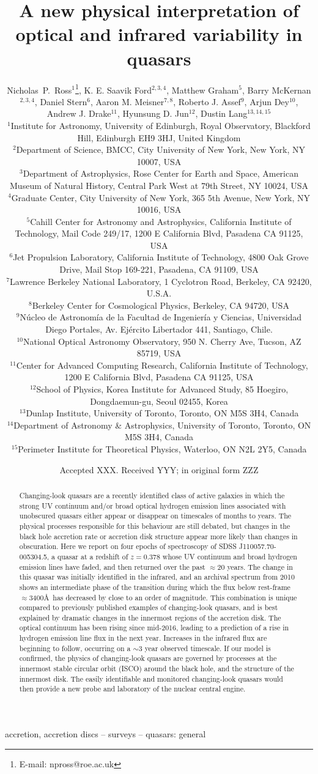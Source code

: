 \documentclass[a4paper,fleqn,usenatbib]{mnras}
\title[Variability in the quasar J1100-0053]{A new physical interpretation of optical and infrared variability in quasars}
\author[N.P. Ross et al.]
{Nicholas~P.~Ross$^{1}$\thanks{E-mail: npross@roe.ac.uk},    
K. E. Saavik Ford$^{2,3,4}$,  Matthew Graham$^{5}$,  Barry McKernan$^{2,3,4}$,  
\newauthor Daniel Stern$^{6}$, Aaron M. Meisner$^{7,8}$, Roberto J. Assef$^{9}$, 
Arjun Dey$^{10}$, Andrew J. Drake$^{11}$, 
\newauthor Hyunsung D. Jun$^{12}$, Dustin Lang$^{13,14,15}$
\\
$^{1}$Institute for Astronomy, University of Edinburgh, Royal Observatory, Blackford Hill, Edinburgh EH9 3HJ, United Kingdom \\
$^{2}$Department of Science, BMCC, City University of New York, New York, NY 10007, USA \\
$^{3}$Department of Astrophysics, Rose Center for Earth and Space, American Museum of Natural History, Central Park West at 79th Street, NY 10024, USA \\
$^{4}$Graduate Center, City University of New York, 365 5th Avenue, New York, NY 10016, USA\\
$^{5}$Cahill Center for Astronomy and Astrophysics, California Institute of Technology, Mail Code 249/17, 1200 E California Blvd, Pasadena CA 91125, USA\\
$^{6}$Jet Propulsion Laboratory, California Institute of Technology, 4800 Oak Grove Drive, Mail Stop 169-221, Pasadena, CA 91109, USA \\
$^{7}$Lawrence Berkeley National Laboratory, 1 Cyclotron Road, Berkeley, CA 92420, U.S.A. \\
$^{8}$Berkeley Center for Cosmological Physics, Berkeley, CA 94720, USA\\
$^{9}$N\'ucleo de Astronom\'ia de la Facultad de Ingenier\'ia y Ciencias, Universidad Diego Portales, Av. Ej\'ercito Libertador 441, Santiago, Chile.\\
$^{10}$National Optical Astronomy Observatory, 950 N. Cherry Ave, Tucson, AZ 85719, USA \\
$^{11}$Center for Advanced Computing Research, California Institute of Technology, 1200 E California Blvd, Pasadena CA 91125, USA \\
$^{12}$School of Physics, Korea Institute for Advanced Study, 85 Hoegiro, Dongdaemun-gu, Seoul 02455, Korea\\
$^{13}$Dunlap Institute, University of Toronto, Toronto, ON M5S 3H4, Canada \\
$^{14}$Department of Astronomy \& Astrophysics, University of Toronto, Toronto, ON M5S 3H4, Canada \\
$^{15}$Perimeter Institute for Theoretical Physics, Waterloo, ON N2L 2Y5, Canada\\
}
\date{Accepted XXX. Received YYY; in original form ZZZ}
\begin{document}
\label{firstpage}
\pagerange{\pageref{firstpage}--\pageref{lastpage}}
\maketitle


\begin{abstract}
Changing-look quasars are a recently identified class of active galaxies in which the strong UV continuum and/or broad optical hydrogen emission lines associated with unobscured quasars either appear or disappear on timescales of months to years.  The physical processes responsible for this behaviour are still debated, but changes in the black hole accretion rate or accretion disk structure appear more likely than changes in obscuration. Here we report on four epochs of spectroscopy of SDSS J110057.70-005304.5, a quasar at a redshift of $z=0.378$ whose UV continuum and broad hydrogen emission lines have faded, and then returned over the past $\approx$20 years. The change in this quasar was initially identified in the infrared, and an archival spectrum from 2010 shows an intermediate phase of the transition during which the flux below rest-frame $\approx$3400\AA\ has decreased by close to an order of magnitude. This combination is unique compared to previously published examples of changing-look quasars, and is best explained by dramatic changes in the innermost regions of the accretion disk. The optical continuum has been rising since mid-2016, leading to a prediction of a rise in hydrogen emission line flux in the next year. Increases in the infrared flux are beginning to follow, occurring on a $\sim$3 year observed timescale. If our model is confirmed, the physics of changing-look quasars are governed by processes at the innermost stable circular orbit (ISCO) around the black hole, and the structure of the innermost disk. The easily identifiable and monitored changing-look quasars would then provide a new probe and laboratory of the nuclear central engine.
\end{abstract}

\begin{keywords}
accretion, accretion discs -- surveys -- quasars: general
\end{keywords}




\end{document}
